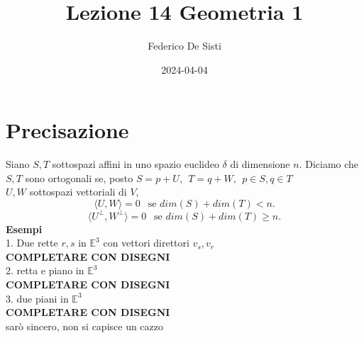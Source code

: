 \documentclass[12px]{article}
\title{Lezione 14 Geometria 1}
\date{2024-04-04}
\author{Federico De Sisti}
\theoremstyle{break}
\theoremstyle{break}
\theoremstyle{break}
\theoremstyle{break}
\theoremstyle{break}
\theoremstyle{break}
\begin{document}
	\maketitle
	\newpage
	\section{Precisazione}
	Siano $S,T$ sottospazi affini in uno spazio euclideo $\delta$ di dimensione $n$. Diciamo che $S,T$ sono ortogonali se, posto $S = p + U, \ \ T= q + W, \ \ p\in S,q\in T$\\
	 $U,W$ sottospazi vettoriali di $V$,
	 \[
		 \langle U, W \rangle = 0\ \ \text{ se } dim(S) + dim(T) < n
	 .\] 
	 \[
		 \langle U^\perp, W^\perp \rangle  = 0 \ \ \text{ se } dim(S) + dim(T) \geq n
	 .\] 
	 \textbf{Esempi}\\
	 1. Due rette $r, s$ in $\mathbb{E}^3$ con vettori direttori $v_s, v_r$ \\
	 \textbf{COMPLETARE CON DISEGNI}\\
	2. retta e piano in $\mathbb{E}^3$\\
	\textbf{COMPLETARE CON DISEGNI}\\
	3. due piani in $\mathbb{E}^3$\\
	\textbf{COMPLETARE CON DISEGNI}\\
	sarò sincero, non si capisce un cazzo
\end{document}
